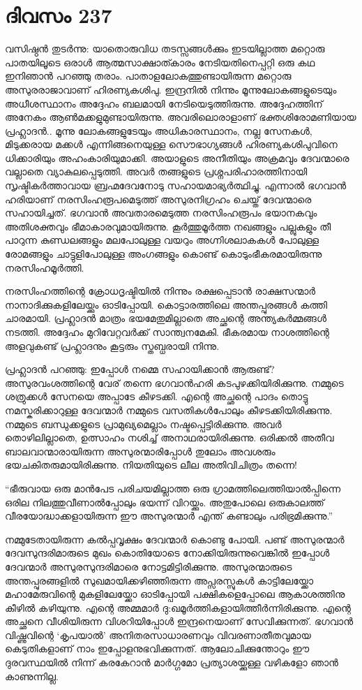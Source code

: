 \section{ദിവസം 237}


വസിഷ്ഠന്‍ തുടര്‍ന്നു: യാതൊരുവിധ തടസ്സങ്ങള്‍ക്കും ഇടയില്ലാത്ത മറ്റൊരു പാതയിലൂടെ ഒരാള്‍ ആത്മസാക്ഷാത്കാരം നേടിയതിനെപ്പറ്റി ഒരു കഥ ഇനിഞാന്‍ പറഞ്ഞു തരാം. പാതാളലോകത്തുണ്ടായിരുന്ന മറ്റൊരു അസുരരാജാവാണ് ഹിരണ്യകശിപു. ഇന്ദ്രനില്‍ നിന്നും മൂന്നുലോകങ്ങളുടെയും അധീശസ്ഥാനം അദ്ദേഹം ബലമായി നേടിയെടുത്തിരുന്നു. അദ്ദേഹത്തിന് അനേകം ആണ്‍മക്കളുമുണ്ടായിരുന്നു. അവരിലൊരാളാണ് ഭക്തശിരോമണിയായ പ്രഹ്ലാദന്‍.. മൂന്നു ലോകങ്ങളുടേയും അധികാരസ്ഥാനം, നല്ല സേനകള്‍, മിടുക്കരായ മക്കള്‍ എന്നിങ്ങനെയുള്ള സൌഭാഗ്യങ്ങള്‍ ഹിരണ്യകശിപുവിനെ ധിക്കാരിയും അഹംകാരിയുമാക്കി. അയാളുടെ അനീതിയും അക്രമവും ദേവന്മാരെ വല്ലാതെ വ്യാകുലപ്പെടുത്തി. അവര്‍ തങ്ങളുടെ പ്രശ്നപരിഹാരത്തിനായി സൃഷ്ടികര്‍ത്താവായ ബ്രഹ്മദേവനോടു സഹായമാഭ്യര്‍ത്ഥിച്ചു. എന്നാല്‍ ഭഗവാന്‍ ഹരിയാണ്  നരസിംഹരൂപമെടുത്ത്‌ അസുരനിഗ്രഹം ചെയ്ത് ദേവന്മാരെ സഹായിച്ചത്.
ഭഗവാന്‍ അവതാരമെടുത്ത നരസിംഹരൂപം ഭയാനകവും അതിശക്തവും ഭീമാകാരവുമായിരുന്നു. കൂര്‍ത്തുമൂര്‍ത്ത നഖങ്ങളും പല്ലുകളും തീ പാറുന്ന കുണ്ഡലങ്ങളും മലപോലുള്ള വയറും അഗ്നിശലാകകള്‍ പോലുള്ള രോമങ്ങളും ചാട്ടുളിപോലുള്ള അംഗങ്ങളും കൊണ്ട് കൊടുംഭീകരമായിരുന്നു നരസിംഹമൂര്‍ത്തി.  
   
നരസിംഹത്തിന്റെ ക്രോധദൃഷ്ടിയില്‍ നിന്നും രക്ഷപ്പെടാന്‍ രാക്ഷസന്മാര്‍ നാനാദിക്കുകളിലേയ്ക്കും ഓടിപ്പോയി. കൊട്ടാരത്തിലെ അന്തപ്പുരങ്ങള്‍ കത്തി ചാരമായി. പ്രഹ്ലാദന്‍ മാത്രം ഭയമേതുമില്ലാതെ അച്ഛന്റെ അന്ത്യകര്‍മ്മങ്ങള്‍ നടത്തി. അദ്ദേഹം മുറിവേറ്റവര്‍ക്ക് സാന്ത്വനമേകി. ഭീകരമായ നാശത്തിന്റെ അളവുകണ്ട് പ്രഹ്ലാദനും കൂട്ടരും സ്തബ്ധരായി നിന്നു.

പ്രഹ്ലാദന്‍ പറഞ്ഞു: ഇപ്പോള്‍ നമ്മെ സഹായിക്കാന്‍ ആരുണ്ട്? അസുരവംശത്തിന്റെ വേര് തന്നെ ഭഗവാന്‍ഹരി കടപുഴക്കിയിരിക്കുന്നു. നമ്മുടെ ശത്രുക്കള്‍ സേനയെ അപ്പാടേ കീഴടക്കി. എന്റെ അച്ഛന്റെ പാദം തൊട്ടു നമസ്കരിക്കാറുള്ള ദേവന്മാര്‍ നമ്മുടെ വസതികള്‍പോലും കീഴടക്കിയിരിക്കുന്നു. നമ്മുടെ ബന്ധുക്കളുടെ പ്രാമുഖ്യമെല്ലാം നഷ്ടപ്പെട്ടിരിക്കുന്നു. അവര്‍ തൊഴിലില്ലാതെ, ഉത്സാഹം നശിച്ച് അനാഥരായിരിക്കുന്നു. ഒരിക്കല്‍ അതീവ ബാലവാന്മാരായിരുന്ന അസുരന്മാരിപ്പോള്‍ തുലോം അവശരും ഭയചകിതരുമായിരിക്കുന്നു. നിയതിയുടെ ലീല അതിവിചിത്രം തന്നെ!

“ഭീരുവായ ഒരു മാന്‍പേട പരിചയമില്ലാത്ത ഒരു ഗ്രാമത്തിലെത്തിയാല്‍പ്പിന്നെ ഒരില നിലത്തുവീണാല്‍പ്പോലും ഭയന്ന് വിറയ്ക്കും. അതുപോലെ ഒരുകാലത്ത് വീരയോദ്ധാക്കളായിരുന്ന ഈ അസുരന്മാര്‍ എന്ത് കണ്ടാലും പരിഭ്രമിക്കുന്നു.”

നമ്മുടേതായിരുന്ന കല്‍പ്പവൃക്ഷം ദേവന്മാര്‍ കൊണ്ടു പോയി. പണ്ട് അസുരന്മാര്‍ ദേവസുന്ദരിമാരുടെ മുഖം കൊതിയോടെ നോക്കിയിരുന്നുവെങ്കില്‍ ഇപ്പോള്‍ ദേവന്മാര്‍ അസുരസുന്ദരിമാരെ നോട്ടമിട്ടിരിക്കുന്നു. അസുരന്മാരുടെ അന്തപ്പുരങ്ങളില്‍ സുഖമായിക്കഴിഞ്ഞിരുന്ന അപ്സരസ്സുകള്‍  കാട്ടിലേയ്ക്കോ മഹാമേരുവിന്റെ മുകളിലേയ്ക്കോ ഓടിപ്പോയി പക്ഷികളെപ്പോലെ ആകാശത്തിനു കീഴില്‍ കഴിയുന്നു. എന്റെ അമ്മമാര്‍ ദു:ഖമൂര്‍ത്തികളായിത്തീര്‍ന്നിരിക്കുന്നു. എന്റെ അച്ഛനെ വീശിയിരുന്ന വിശറിയിപ്പോള്‍ ഇന്ദ്രനെയാണ് സേവിക്കുന്നത്. ഭഗവാന്‍ വിഷ്ണുവിന്റെ ‘കൃപയാല്‍’ അനിതരസാധാരണവും വിവരണാതീതവുമായ കെടുതികളാണ് നാം ഇപ്പോളനുഭവിക്കുന്നത്. ആലോചിക്കുന്തോറും ഈ ദുരവസ്ഥയില്‍ നിന്ന് കരകേറാന്‍ മാര്‍ഗ്ഗമോ പ്രത്യാശയ്ക്കുള്ള വഴികളോ ഞാന്‍ കാണുന്നില്ല.

